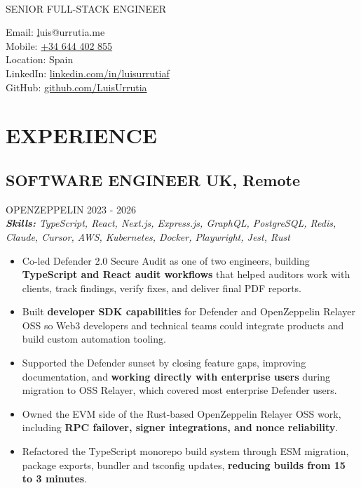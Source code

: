 \documentclass{article}
\newcommand{\WorkExperience}[2]{
   \subsection*{#1}
   \vspace{-1em}
   \uppercase{#2}
}
\newcommand{\Skills}[1]{
   \textit{\textbf{Skills:} #1}
}
\begin{document}
\begin{center}
	\begin{minipage}{0.5\textwidth}
		{\fontsize{24}{28}\Title{}} \\
		\bigskip
		{\normalsize \MakeUppercase{Senior Full-Stack Engineer}}
	\end{minipage} \hfill
	\begin{minipage}{0.4\textwidth}
		\raggedleft{}
		Email: \href{mailto:luis@urrutia.me}luis@urrutia.me \\
		Mobile: \href{tel:+34644402855}{+34 644 402 855}  \\
		Location: Spain \\
		LinkedIn: \href{https://linkedin.com/in/luisurrutiaf}{linkedin.com/in/luisurrutiaf} \\
		GitHub: \href{https://github.com/LuisUrrutia}{github.com/LuisUrrutia}
	\end{minipage}
\end{center}

\vspace{-3em}

\phantom{Amazon, Microsoft, Facebook} %

\section*{EXPERIENCE}
\WorkExperience{SOFTWARE ENGINEER \hfill UK, Remote}{OpenZeppelin \hfill 2023 {-} 2026} \\
\Skills{TypeScript, React, Next.js, Express.js, GraphQL, PostgreSQL, Redis, Claude, Cursor, AWS, Kubernetes, Docker, Playwright, Jest, Rust}
\begin{itemize}
	\item Co-led Defender 2.0 Secure Audit as one of two engineers, building \textbf{TypeScript and React audit workflows} that helped auditors work with clients, track findings, verify fixes, and deliver final PDF reports.
	\item Built \textbf{developer SDK capabilities} for Defender and OpenZeppelin Relayer OSS so Web3 developers and technical teams could integrate products and build custom automation tooling.
	\item Supported the Defender sunset by closing feature gaps, improving documentation, and \textbf{working directly with enterprise users} during migration to OSS Relayer, which covered most enterprise Defender users.
	\item Owned the EVM side of the Rust-based OpenZeppelin Relayer OSS work, including \textbf{RPC failover, signer integrations, and nonce reliability}.
	\item Refactored the TypeScript monorepo build system through ESM migration, package exports, bundler and tsconfig updates, \textbf{reducing builds from 15 to 3 minutes}.
\end{itemize}
\end{document}
